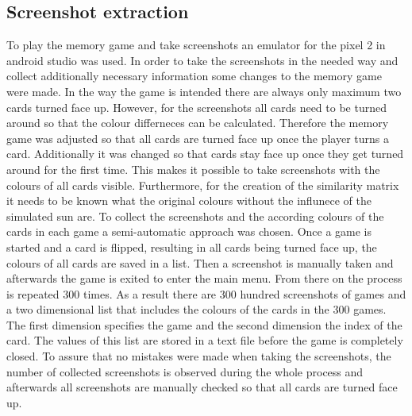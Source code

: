 \subsection{Screenshot extraction}
To play the memory game and take screenshots an emulator for the pixel 2 in android studio was used. In order to take the screenshots in the needed way and collect additionally necessary information some changes to the memory game were made. In the way the game is intended there are always only maximum two cards turned face up. However, for the screenshots all cards need to be turned around so that the colour differneces can be calculated. Therefore the memory game was adjusted so that all cards are turned face up once the player turns a card. Additionally it was changed so that cards stay face up once they get turned around for the first time. This makes it possible to take screenshots with the colours of all cards visible. Furthermore, for the creation of the similarity matrix it needs to be known what the original colours without the influnece of the simulated sun are. To collect the screenshots and the according colours of the cards in each game a semi-automatic approach was chosen. Once a game is started and a card is flipped, resulting in all cards being turned face up, the colours of all cards are saved in a list. Then a screenshot is manually taken and afterwards the game is exited to enter the main menu. From there on the process is repeated 300 times. As a result there are 300 hundred screenshots of games and a two dimensional list that includes the colours of the cards in the 300 games. The first dimension specifies the game and the second dimension the index of the card. The values of this list are stored in a text file before the game is completely closed. To assure that no mistakes were made when taking the screenshots, the number of collected screenshots is observed during the whole process and afterwards all screenshots are manually checked so that all cards are turned face up.

